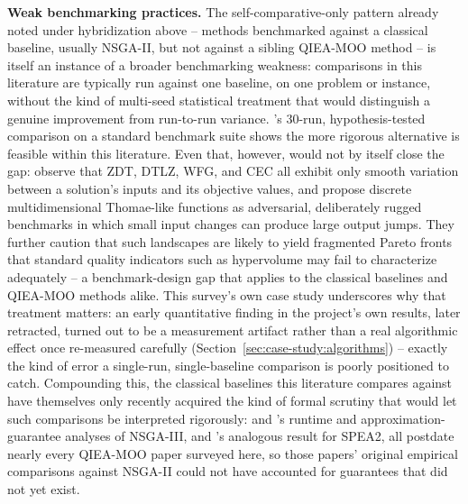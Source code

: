 \textbf{Weak benchmarking practices.} The self-comparative-only pattern
already noted under hybridization above -- methods benchmarked against
a classical baseline, usually NSGA-II, but not against a sibling
QIEA-MOO method -- is itself an
instance of a broader benchmarking weakness: comparisons in this
literature are typically run against one baseline, on one problem or
instance, without the kind of multi-seed statistical treatment that
would distinguish a genuine improvement from run-to-run variance.
\citet{olvera2023continuous}'s 30-run, hypothesis-tested comparison on
a standard benchmark suite shows the more rigorous alternative is
feasible within this literature. Even that, however, would not by
itself close the gap: \citet{patrausanu2026thomae} observe that ZDT, DTLZ,
WFG, and CEC all exhibit only smooth variation between a solution's
inputs and its objective values, and propose discrete multidimensional
Thomae-like functions as adversarial, deliberately rugged benchmarks
in which small input changes can produce large output jumps. They
further caution that such landscapes are likely to yield fragmented
Pareto fronts that standard quality indicators such as hypervolume may
fail to characterize adequately -- a benchmark-design gap that applies
to the classical baselines and QIEA-MOO methods alike. This
survey's own case study underscores why that treatment matters: an
early quantitative finding in the project's own results, later
retracted, turned out to be a measurement artifact rather than a real
algorithmic effect once re-measured carefully
(Section~\ref{sec:case-study:algorithms}) -- exactly the kind of error a
single-run, single-baseline comparison is poorly positioned to catch.
Compounding this, the classical baselines this literature compares
against have themselves only recently acquired the kind of formal
scrutiny that would let such comparisons be interpreted rigorously:
\citet{opris2024nsga3runtime} and \citet{deng2025nsga3guarantees}'s
runtime and approximation-guarantee analyses of NSGA-III, and
\citet{alghouass2025spea2beatsnsga2}'s analogous result for SPEA2, all
postdate nearly every QIEA-MOO paper surveyed here, so those papers'
original empirical comparisons against NSGA-II could not have accounted
for guarantees that did not yet exist.


